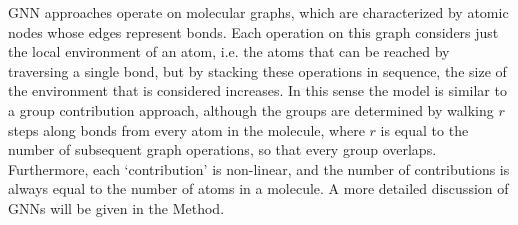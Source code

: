 GNN approaches operate on molecular graphs, which are characterized by atomic
nodes whose edges represent bonds. Each operation on this graph considers just
the local environment of an atom, i.e. the atoms that can be reached by
traversing a single bond, but by stacking these operations in sequence, the size
of the environment that is considered increases. In this sense the model is
similar to a group contribution approach, although the groups are determined by
walking $r$ steps along bonds from every atom in the molecule, where $r$ is
equal to the number of subsequent graph operations, so that every group
overlaps. Furthermore, each `contribution' is non-linear, and the number of
contributions is always equal to the number of atoms in a molecule. A more
detailed discussion of GNNs will be given in the Method.